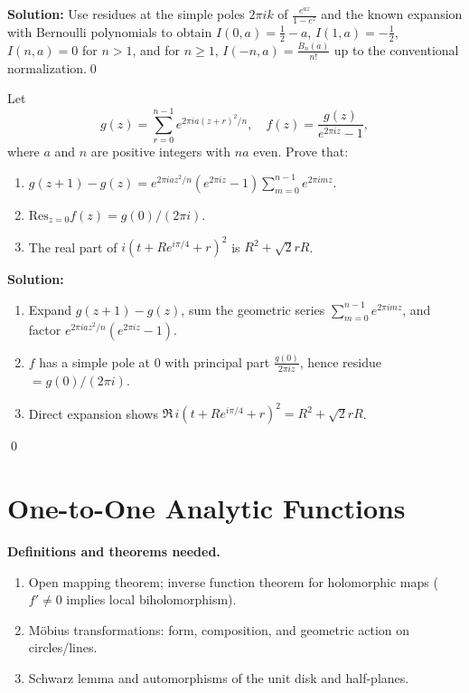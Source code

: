\bigskip\noindent\textbf{Solution:}
Use residues at the simple poles $2\pi i k$ of $\frac{e^{az}}{1-e^z}$ and the known expansion with Bernoulli polynomials to obtain $I(0,a)=\tfrac12-a$, $I(1,a)=-\tfrac12$, $I(n,a)=0$ for $n>1$, and for $n\ge1$, $I(-n,a)=\tfrac{B_n(a)}{n!}$ up to the conventional normalization.\qed


\begin{problembox}
Let
\[ g(z) = \sum_{r=0}^{n-1} e^{2\pi i a (z + r)^2 / n}, \quad f(z) = \frac{g(z)}{e^{2\pi i z} - 1}, \]
where \( a \) and \( n \) are positive integers with \( na \) even. Prove that:
\begin{enumerate}[label=(\alph*)]
\item \( g(z + 1) - g(z) = e^{2\pi i a z^2 / n} (e^{2\pi i z} - 1) \sum_{m=0}^{n-1} e^{2\pi i m z}. \)
\item \( \text{Res}_{z=0} f(z) = g(0) / (2\pi i). \)
\item The real part of \( i (t + R e^{i\pi / 4} + r)^2 \) is \( R^2 + \sqrt{2} r R \).
\end{enumerate}
\end{problembox}

\bigskip\noindent\textbf{Solution:}
\begin{enumerate}[label=(\alph*)]
\item Expand $g(z+1)-g(z)$, sum the geometric series $\sum_{m=0}^{n-1}e^{2\pi i m z}$, and factor $e^{2\pi i a z^2/n}(e^{2\pi i z}-1)$.
\item $f$ has a simple pole at $0$ with principal part $\frac{g(0)}{2\pi i z}$, hence residue $=g(0)/(2\pi i)$.
\item Direct expansion shows $\Re\,i(t+Re^{i\pi/4}+r)^2=R^2+\sqrt2 rR$.
\end{enumerate}\qed
\section{One-to-One Analytic Functions}

\noindent\textbf{Definitions and theorems needed.}
\begin{enumerate}[label=(\alph*)]
\item Open mapping theorem; inverse function theorem for holomorphic maps ($f'\ne0$ implies local biholomorphism).
\item Möbius transformations: form, composition, and geometric action on circles/lines.
\item Schwarz lemma and automorphisms of the unit disk and half-planes.
\end{enumerate}



